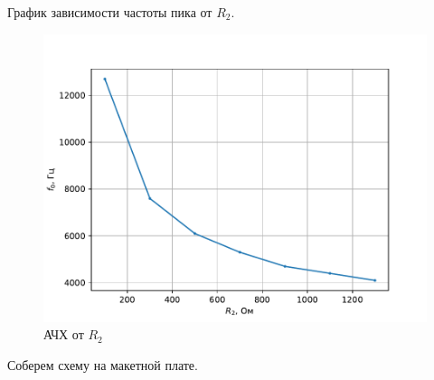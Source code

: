 \documentclass[12pt,a4paper]{article}
\begin{document}
	График зависимости частоты пика от $R_2$.
	\begin{figure}[H]
		\centering
		\includegraphics[width=0.8\linewidth]{res/amp1bp_R2.pdf}
		\caption{АЧХ от $R_2$}
		\label{ach}
	\end{figure}
	
	Соберем схему на макетной плате.
	
\end{document}
